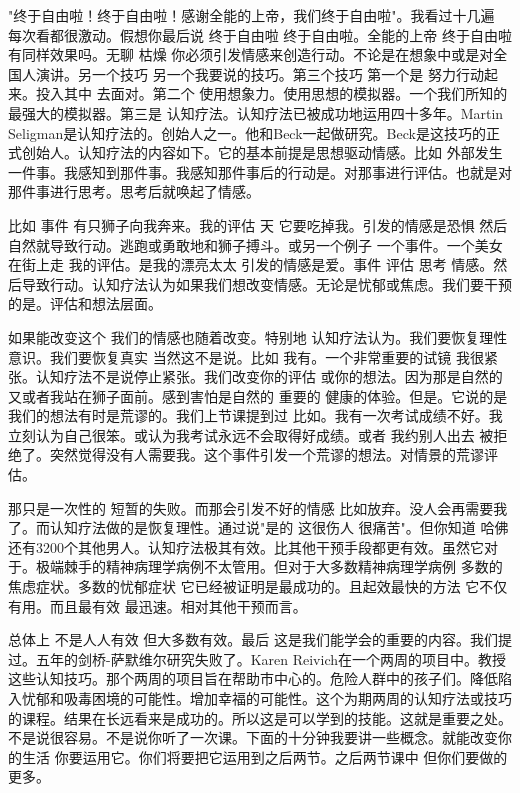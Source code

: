 "终于自由啦！终于自由啦！感谢全能的上帝，我们终于自由啦"。我看过十几遍 每次看都很激动。假想你最后说 终于自由啦 终于自由啦。全能的上帝 终于自由啦 有同样效果吗。无聊 枯燥 你必须引发情感来创造行动。不论是在想象中或是对全国人演讲。另一个技巧 另一个我要说的技巧。第三个技巧 第一个是 努力行动起来。投入其中 去面对。第二个 使用想象力。使用思想的模拟器。一个我们所知的最强大的模拟器。第三是 认知疗法。认知疗法已被成功地运用四十多年。Martin Seligman是认知疗法的。创始人之一。他和Beck一起做研究。Beck是这技巧的正式创始人。认知疗法的内容如下。它的基本前提是思想驱动情感。比如 外部发生一件事。我感知到那件事。我感知那件事后的行动是。对那事进行评估。也就是对那件事进行思考。思考后就唤起了情感。 

比如 事件 有只狮子向我奔来。我的评估 天 它要吃掉我。引发的情感是恐惧 然后自然就导致行动。逃跑或勇敢地和狮子搏斗。或另一个例子 一个事件。一个美女在街上走 我的评估。是我的漂亮太太 引发的情感是爱。事件 评估 思考 情感。然后导致行动。认知疗法认为如果我们想改变情感。无论是忧郁或焦虑。我们要干预的是。评估和想法层面。 

如果能改变这个 我们的情感也随着改变。特别地 认知疗法认为。我们要恢复理性意识。我们要恢复真实 当然这不是说。比如 我有。一个非常重要的试镜 我很紧张。认知疗法不是说停止紧张。我们改变你的评估 或你的想法。因为那是自然的 又或者我站在狮子面前。感到害怕是自然的 重要的 健康的体验。但是。它说的是我们的想法有时是荒谬的。我们上节课提到过 比如。我有一次考试成绩不好。我立刻认为自己很笨。或认为我考试永远不会取得好成绩。或者 我约别人出去 被拒绝了。突然觉得没有人需要我。这个事件引发一个荒谬的想法。对情景的荒谬评估。 

那只是一次性的 短暂的失败。而那会引发不好的情感 比如放弃。没人会再需要我了。而认知疗法做的是恢复理性。通过说"是的 这很伤人 很痛苦"。但你知道 哈佛还有3200个其他男人。认知疗法极其有效。比其他干预手段都更有效。虽然它对于。极端棘手的精神病理学病例不太管用。但对于大多数精神病理学病例 多数的焦虑症状。多数的忧郁症状 它已经被证明是最成功的。且起效最快的方法 它不仅有用。而且最有效 最迅速。相对其他干预而言。 

总体上 不是人人有效 但大多数有效。最后 这是我们能学会的重要的内容。我们提过。五年的剑桥-萨默维尔研究失败了。Karen Reivich在一个两周的项目中。教授这些认知技巧。那个两周的项目旨在帮助市中心的。危险人群中的孩子们。降低陷入忧郁和吸毒困境的可能性。增加幸福的可能性。这个为期两周的认知疗法或技巧的课程。结果在长远看来是成功的。所以这是可以学到的技能。这就是重要之处。不是说很容易。不是说你听了一次课。下面的十分钟我要讲一些概念。就能改变你的生活 你要运用它。你们将要把它运用到之后两节。之后两节课中 但你们要做的更多。 

